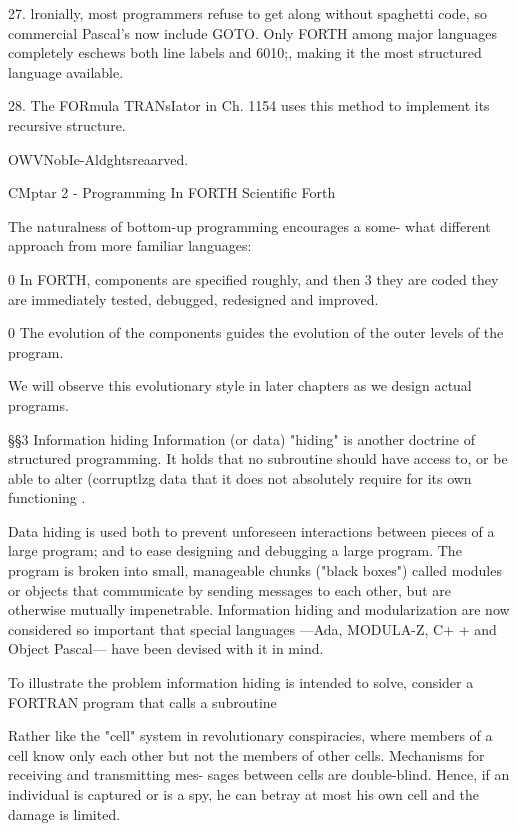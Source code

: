  

27. lronially, most programmers refuse to get along without spaghetti code, so commercial Pascal's
now include GOTO. Only FORTH among major languages completely eschews both line labels
and 6010;, making it the most structured language available.

28. The FORmula TRANsIator in Ch. 1154 uses this method to implement its recursive structure.

OWVNobIe-Aldghtsreaarved.

CMptar 2 - Programming In FORTH Scientific Forth

The naturalness of bottom-up programming encourages a some-
what different approach from more familiar languages:

0 In FORTH, components are specified roughly, and then 3 they
are coded they are immediately tested, debugged, redesigned
and improved.

0 The evolution of the components guides the evolution of the
outer levels of the program.

We will observe this evolutionary style in later chapters as we
design actual programs.

§§3 Information hiding
Information (or data) "hiding" is another doctrine of structured
programming. It holds that no subroutine should have access
to, or be able to alter (corruptlzg data that it does not absolutely
require for its own functioning .

Data hiding is used both to prevent unforeseen interactions
between pieces of a large program; and to ease designing and
debugging a large program. The program is broken into small,
manageable chunks ("black boxes") called modules or objects
that communicate by sending messages to each other, but are
otherwise mutually impenetrable. Information hiding and
modularization are now considered so important that special
languages —Ada, MODULA-Z, C+ + and Object Pascal— have
been devised with it in mind.

To illustrate the problem information hiding is intended to solve,
consider a FORTRAN program that calls a subroutine

 

Rather like the "cell" system in revolutionary conspiracies, where members of a cell know only
each other but not the members of other cells. Mechanisms for receiving and transmitting mes-
sages between cells are double-blind. Hence, if an individual is captured or is a spy, he can
betray at most his own cell and the damage is limited.

